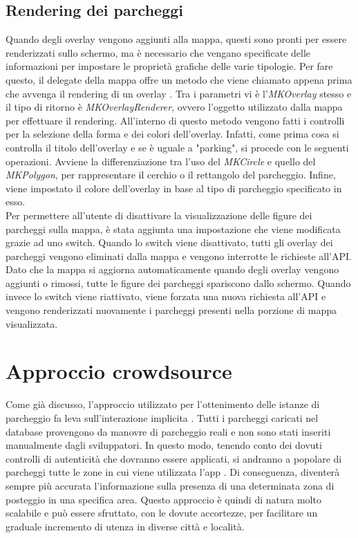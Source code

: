 \subsection{Rendering dei parcheggi}

Quando degli overlay vengono aggiunti alla mappa, questi sono pronti per essere
renderizzati sullo schermo, ma è necessario che vengano specificate delle informazioni
per impostare le proprietà grafiche delle varie tipologie. Per fare questo, il delegate
della mappa offre un metodo che viene chiamato appena prima che avvenga il rendering
di un overlay \cite{dynamic_rendering_map_information}. Tra i parametri vi è 
l'\emph{MKOverlay} stesso e il tipo di ritorno
è \emph{MKOverlayRenderer}, ovvero l'oggetto utilizzato dalla mappa per effettuare 
il rendering. All'interno di questo metodo vengono fatti i controlli per la selezione
della forma e dei colori dell'overlay. Infatti, come prima cosa si controlla il titolo
dell'overlay e se è uguale a "parking", si procede con le seguenti operazioni. Avviene
la differenziazione tra l'uso del \emph{MKCircle} e quello del \emph{MKPolygon}, per 
rappresentare il cerchio o il rettangolo del parcheggio. Infine, viene impostato
il colore dell'overlay in base al tipo di parcheggio specificato in esso.\\
Per permettere all'utente di disattivare la visualizzazione delle figure dei parcheggi
sulla mappa, è stata aggiunta una impostazione che viene modificata grazie ad uno switch.
Quando lo switch viene disattivato, tutti gli overlay dei parcheggi vengono eliminati 
dalla mappa e vengono interrotte le richieste all'API. Dato che la mappa si aggiorna 
automaticamente quando degli overlay vengono aggiunti o rimossi, tutte le figure 
dei parcheggi spariscono dallo schermo. Quando invece lo switch viene riattivato,
viene forzata una nuova richiesta all'API e vengono renderizzati nuovamente i parcheggi
presenti nella porzione di mappa visualizzata.

\section{Approccio crowdsource}

Come già discusso, l'approccio utilizzato per l'ottenimento delle istanze di parcheggio
fa leva sull'interazione implicita \cite{explicating_implicit_interaction}. Tutti i 
parcheggi caricati nel database
provengono da manovre di parcheggio reali e non sono stati inseriti manualmente dagli
sviluppatori. In questo modo, tenendo conto dei dovuti controlli di autenticità che 
dovranno essere applicati, si andranno a popolare di parcheggi tutte le zone in cui 
viene utilizzata l'app \cite{crowdsourcing_geospatial_data}. Di conseguenza, diventerà 
sempre più accurata l'informazione
sulla presenza di una determinata zona di posteggio in una specifica area. Questo 
approccio è quindi di natura molto scalabile e può essere sfruttato, con le dovute
accortezze, per facilitare un graduale incremento di utenza in diverse città e 
località.

